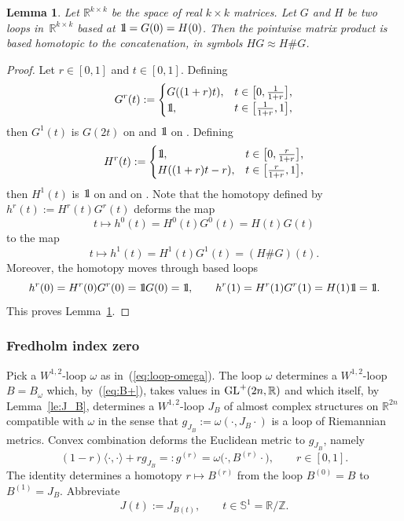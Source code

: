 \documentclass[pdftex]{sigma}
\numberwithin{equation}{section}
\newtheorem{Lemma}[Theorem]{Lemma}
\newcommand{\R}{{\mathbb{R}}}
\renewcommand{\SS}{{\mathbb{S}}}
\newcommand{\Z}{{\mathbb{Z}}}
\newcommand{\GL}{{\rm GL}}
\newcommand{\1}{{{\mathchoice {\rm 1\mskip-4mu l} {\rm 1\mskip-4mu l}
{\rm 1\mskip-4.5mu l} {\rm 1\mskip-5mu l}}}}
\begin{document}
\begin{Lemma}\label{le:HG-concat}
Let $\R^{k\times k}$ be the space of real $k\times k$ matrices.
Let $G$ and $H$ be two loops in~$\R^{k\times k}$ based at $\1=G(0)=H(0)$.
Then the pointwise matrix product is based homotopic to the
concatenation, in symbols
$ HG\approx H\# G$.
\end{Lemma}

\begin{proof}
Let $r\in[0,1]$ and $t\in[0,1]$. Defining
\[
 G^r(t)
 :=
 \begin{cases}
 G((1+r)t), &\text{$t\in\bigl[0,\frac{1}{1+r}\bigr]$,}
 \\
 \1, &\text{$t\in\bigl[\frac{1}{1+r},1\bigr]$,}
 \end{cases}
\]
then $G^1(t)$ is $G(2t)$ on  and $\1$ on .
Defining
\[
 H^r(t)
 :=
 \begin{cases}
 \1, &\text{$t\in\bigl[0,\frac{r}{1+r}\bigr]$,}
 \\
 H((1+r)t-r), &\text{$t\in\bigl[\frac{r}{1+r},1\bigr]$,}
 \end{cases}
\]
then $H^1(t)$ is $\1$ on  and  on .
Note that the homotopy defined by
$
 h^r(t)
 := H^r(t) G^r(t)
$
deforms the map
\[
 t\mapsto
 h^0(t)
 =H^0(t) G^0(t)
 =H(t) G(t)
\]
to the map
\[
 t\mapsto
 h^1(t)
 =H^1(t) G^1(t)
 = (H\# G )(t) .
\]
Moreover, the homotopy moves through based loops
\[
 h^r(0)=H^r(0)G^r(0)=\1G(0)=\1
 ,\qquad
 h^r(1)=H^r(1)G^r(1)=H(1)\1=\1 .
\]
This proves Lemma~\ref{le:HG-concat}.
\end{proof}



\subsubsection*{Fredholm index zero}

Pick a $W^{1,2}$-loop $\omega$ as in~(\ref{eq:loop-omega}).
The loop $\omega$ determines a $W^{1,2}$-loop $B=B_\omega$ which,
by~(\ref{eq:B+}), takes values in $\GL^+(2n,\R)$ and which itself, by
Lemma~\ref{le:J_B}, determines a $W^{1,2}$-loop $J_{B}$
of almost complex structures on $\R^{2n}$
compatible with $\omega$ in the sense that
$g_{J_B}:=\omega(\cdot,J_B\cdot)$
is a loop of Riemannian metrics.
Convex combination deforms
the Euclidean metric to $g_{J_B}$, namely
\begin{equation}\label{eq:hghgj7758}
 (1-r)\langle{\cdot},{\cdot}\rangle+ r g_{J_B}
 =:g^{(r)}
 =\omega\bigl(\cdot, B^{(r)}\cdot\bigr)
 ,\qquad r\in[0,1] .
\end{equation}
The identity determines a homotopy $r\mapsto B^{(r)}$
from the loop $B^{(0)}=B$ to $B^{(1)}=J_B$.
Abbreviate
\[
 J(t):=J_{B(t)}
 ,\qquad
 t\in\SS^1=\R/\Z .
\]
\end{document}
